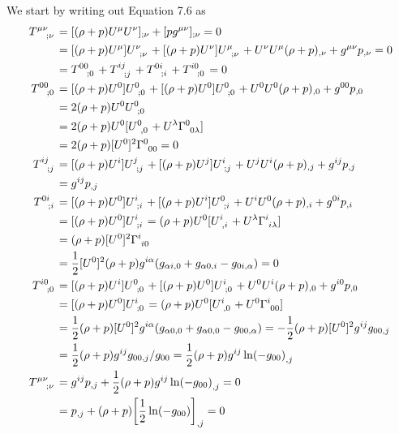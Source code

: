 \documentclass[gr-notes.tex]{subfiles}
\begin{document}
We start by writing out Equation 7.6 as
%
\begin{align*}
  \tensor{T}{^{\mu\nu}_{;\nu}} &=
  [(\rho + p) U^\mu U^\nu]_{;\nu} + [p g^{\mu\nu}]_{;\nu} =
  0
  \\ &=
  [(\rho + p) U^\mu] \tensor{U}{^\nu_{;\nu}} +
  [(\rho + p) U^\nu] \tensor{U}{^\mu_{;\nu}} +
  U^\nu U^\mu (\rho + p)_{,\nu} +
  g^{\mu\nu} p_{,\nu} =
  0
  \\ &=
  \tensor{T}{^{00}_{;0}} +
  \tensor{T}{^{ij}_{;j}} +
  \tensor{T}{^{0i}_{;i}} +
  \tensor{T}{^{i0}_{;0}} =
  0
  \\
  \tensor{T}{^{00}_{;0}} &=
  [(\rho + p) U^0] \tensor{U}{^0_{;0}} +
  [(\rho + p) U^0] \tensor{U}{^0_{;0}} +
  U^0 U^0 (\rho + p)_{,0} +
  g^{00} p_{,0}
  \\ &=
  2 (\rho + p) U^0 \tensor{U}{^0_{;0}}
  \\ &=
  2 (\rho + p) U^0
  [\tensor{U}{^0_{,0}} + U^\lambda \tensor{\Gamma}{^0_{0\lambda}}]
  \\ &=
  2 (\rho + p)
  [U^0]^2 \tensor{\Gamma}{^0_{00}} =
  0
  \\
  \tensor{T}{^{ij}_{;j}} &=
  [(\rho + p) U^i] \tensor{U}{^j_{;j}} +
  [(\rho + p) U^j] \tensor{U}{^i_{;j}} +
  U^j U^i (\rho + p)_{,j} +
  g^{ij} p_{,j}
  \\ &=
  g^{ij} p_{,j}
  \\
  \tensor{T}{^{0i}_{;i}} &=
  [(\rho + p) U^0] \tensor{U}{^i_{;i}} +
  [(\rho + p) U^i] \tensor{U}{^0_{;i}} +
  U^i U^0 (\rho + p)_{,i} +
  g^{0i} p_{,i}
  \\ &=
  [(\rho + p) U^0] \tensor{U}{^i_{;i}} =
  (\rho + p) U^0
  [\tensor{U}{^i_{,i}} + U^\lambda \tensor{\Gamma}{^i_{i\lambda}}]
  \\ &=
  (\rho + p) [U^0]^2 \tensor{\Gamma}{^i_{i0}}
  \\ &=
  \frac{1}{2} [U^0]^2 (\rho + p)
  g^{i\alpha} (g_{\alpha i,0} + g_{\alpha 0,i} - g_{0i,\alpha}) =
  0
  \\
  \tensor{T}{^{i0}_{;0}} &=
  [(\rho + p) U^i] \tensor{U}{^0_{;0}} +
  [(\rho + p) U^0] \tensor{U}{^i_{;0}} +
  U^0 U^i (\rho + p)_{,0} +
  g^{i0} p_{,0}
  \\ &=
  [(\rho + p) U^0] \tensor{U}{^i_{;0}} =
  (\rho + p) U^0
  [\tensor{U}{^i_{,0}} + U^0 \tensor{\Gamma}{^i_{00}}]
  \\ &=
  \frac{1}{2} (\rho + p) [U^0]^2
  g^{i\alpha} (g_{\alpha0,0} + g_{\alpha0,0} - g_{00,\alpha}) =
 -\frac{1}{2} (\rho + p) [U^0]^2 g^{ij} g_{00,j}
  \\ &=
  \frac{1}{2} (\rho + p) g^{ij} g_{00,j} / g_{00} =
  \frac{1}{2} (\rho + p) g^{ij} \ln(-g_{00})_{,j}
  \\
  \tensor{T}{^{\mu\nu}_{;\nu}} &=
  g^{ij} p_{,j} + \frac{1}{2} (\rho + p) g^{ij} \ln(-g_{00})_{,j} = 0
  \\ &=
  p_{,j} + (\rho + p) \qty[ \frac{1}{2} \ln(-g_{00})]_{,j} = 0
\end{align*}
\end{document}
